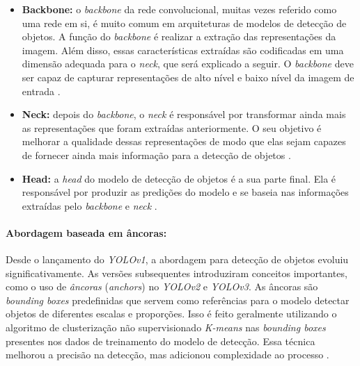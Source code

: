 \begin{itemize}
    \item {\bf Backbone:} o \emph{backbone} da rede convolucional, muitas vezes referido como uma rede em si, é muito comum em arquiteturas de modelos de detecção de objetos. A função do \emph{backbone} é realizar a extração das representações da imagem. Além disso, essas características extraídas são codificadas em uma dimensão adequada para o \emph{neck}, que será explicado a seguir. O \emph{backbone} deve ser capaz de capturar representações de alto nível e baixo nível da imagem de entrada \citep{shroff2021know}.
    
    \item {\bf Neck:} depois do \emph{backbone}, o \emph{neck} é responsável por transformar ainda mais as representações que foram extraídas anteriormente. O seu objetivo é melhorar a qualidade dessas representações de modo que elas sejam capazes de fornecer ainda mais informação para a detecção de objetos \citep{shroff2021know}.

    \item {\bf Head:} a \emph{head} do modelo de detecção de objetos é a sua parte final. Ela é responsável por produzir as predições do modelo e se baseia nas informações extraídas pelo \emph{backbone} e \emph{neck} \citep{shroff2021know}.
\end{itemize}

\paragraph{Abordagem baseada em âncoras:}
Desde o lançamento do \emph{YOLOv1}, a abordagem para detecção de objetos evoluiu significativamente. As versões subsequentes introduziram conceitos importantes, como o uso de \emph{âncoras} (\emph{anchors}) no \emph{YOLOv2} e \emph{YOLOv3}. As âncoras são \emph{bounding boxes} predefinidas que servem como referências para o modelo detectar objetos de diferentes escalas e proporções. Isso é feito geralmente utilizando o algoritmo de clusterização não supervisionado \emph{K-means} nas \emph{bounding boxes} presentes nos dados de treinamento do modelo de detecção. Essa técnica melhorou a precisão na detecção, mas adicionou complexidade ao processo \citep{yolo_review}.

